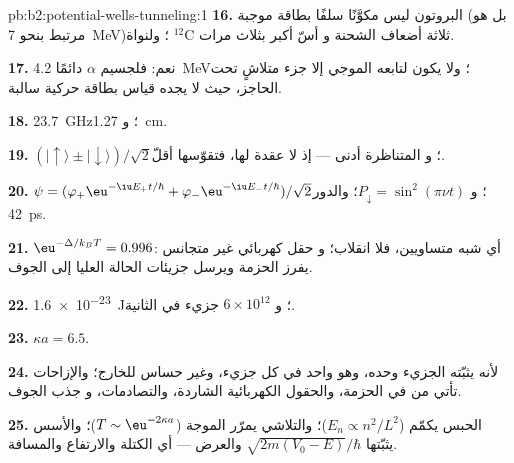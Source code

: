 \begin{solution}{pb:b2:potential-wells-tunneling:1}
\textbf{16.} البروتون ليس مكوَّنًا سلفًا بطاقة موجبة (بل هو
مرتبط بنحو \qty{7}{MeV})؛ ولنواة $^{12}$C ثلاثة أضعاف الشحنة و
أسّ أكبر بثلاث مرات.

\textbf{17.} نعم: فلجسيم $\alpha$ دائمًا \qty{4.2}{MeV}؛ ولا يكون لتابعه الموجي
إلا جزء متلاشٍ تحت الحاجز، حيث لا يجده قياس
بطاقة حركية سالبة.

\textbf{18.} \qty{23.7}{GHz}؛ و \qty{1.27}{cm}.

\textbf{19.} $(|{\uparrow}\rangle \pm |{\downarrow}\rangle)/\sqrt2$؛ و
المتناظرة أدنى --- إذ لا عقدة لها، فتقوّسها أقلّ.

\textbf{20.} $\psi = (\varphi_+\eu^{-\iu E_+t/\hbar} + \varphi_-\eu^{-\iu E_-t/\hbar})/\sqrt2$؛
و $P_{\downarrow} = \sin^2(\pi\nu t)$؛ والدور \qty{42}{ps}.

\textbf{21.} $\eu^{-\Delta/k_BT} = 0.996$: أي شبه متساويين، فلا انقلاب؛ و
حقل كهربائي غير متجانس يفرز الحزمة ويرسل جزيئات الحالة
العليا إلى الجوف.

\textbf{22.} \qty{1.6e-23}{J}؛ و $6 \times 10^{12}$ جزيء في الثانية.

\textbf{23.} $\kappa a = 6.5$.

\textbf{24.} لأنه يثبّته الجزيء وحده، وهو واحد في كل
جزيء، وغير حساس للخارج؛ والإزاحات تأتي من
 في الحزمة، والحقول الكهربائية الشاردة، والتصادمات، و
جذب الجوف.

\textbf{25.} الحبس يكمّم ($E_n \propto n^2/L^2$)؛ والتلاشي يمرّر
الموجة ($T \sim \eu^{-2\kappa a}$)؛ والأسس يثبّتها
$\sqrt{2m(V_0 - E)}/\hbar$ والعرض --- أي الكتلة والارتفاع والمسافة.
\end{solution}
